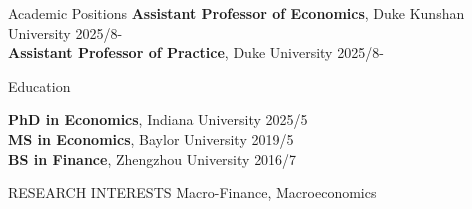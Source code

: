 \documentclass{resume} %
\begin{document}

\begin{rSection}{Academic Positions}
{\bf Assistant Professor of Economics}, Duke Kunshan University \hfill {2025/8-}\\
{\bf Assistant Professor of Practice}, Duke University \hfill {2025/8-}
\end{rSection}


\begin{rSection}{Education}

{\bf PhD in Economics}, Indiana University \hfill {2025/5}\\
{\bf MS in Economics}, Baylor University \hfill {2019/5}\\
{\bf BS in Finance}, Zhengzhou University \hfill {2016/7}


\end{rSection}



\begin{rSection}{RESEARCH INTERESTS}
Macro-Finance, Macroeconomics
\end{rSection}
 
\end{document}
